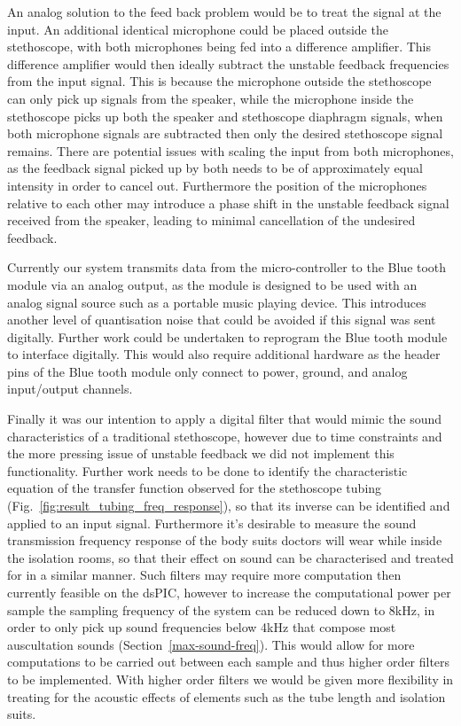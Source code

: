 An analog solution to the feed back problem would be to treat the signal at the input. An additional identical microphone could be placed outside the stethoscope, with both microphones being fed into a difference amplifier. This difference amplifier would then ideally subtract the unstable feedback frequencies from the input signal. This is because the microphone outside the stethoscope can only pick up signals from the speaker, while the microphone inside the stethoscope picks up both the speaker and stethoscope diaphragm signals, when both microphone signals are subtracted then only the desired stethoscope signal remains. There are potential issues with scaling the input from both microphones, as the feedback signal picked up by both needs to be of approximately equal intensity in order to cancel out. Furthermore the position of the microphones relative to each other may introduce a phase shift in the unstable feedback signal received from the speaker, leading to minimal cancellation of the undesired feedback. 


Currently our system transmits data from the micro-controller to the Blue tooth module via an analog output, as the module is designed to be used with an analog signal source such as a portable music playing device. This introduces another level of quantisation noise that could be avoided if this signal was sent digitally. Further work could be undertaken to reprogram the Blue tooth module to interface digitally. This would also require additional hardware as the header pins of the Blue tooth module only connect to power, ground, and analog input/output channels. 


Finally it was our intention to apply a digital filter that would mimic the sound characteristics of a traditional stethoscope, however due to time constraints and the more pressing issue of unstable feedback we did not implement this functionality. Further work needs to be done to identify the characteristic equation of the transfer function observed for the stethoscope tubing (Fig.~\ref{fig:result_tubing_freq_response}), so that its inverse can be identified and applied to an input signal. Furthermore it's desirable to measure the sound transmission frequency response of the body suits doctors will wear while inside the isolation rooms, so that their effect on sound can be characterised and treated for in a similar manner. Such filters may require more computation then currently feasible on the dsPIC, however to increase the computational power per sample the sampling frequency of the system can be reduced down to 8kHz, in order to only pick up sound frequencies below 4kHz that compose most auscultation sounds (Section~\ref{max-sound-freq}). This would allow for more computations to be carried out between each sample and thus higher order filters to be implemented. With higher order filters we would be given more flexibility in treating for the acoustic effects of elements such as the tube length and isolation suits. 

